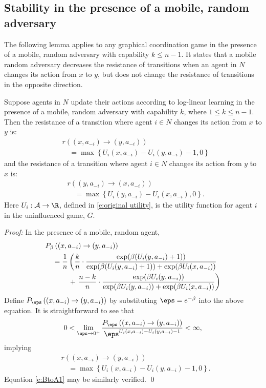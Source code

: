 \subsection{Stability in the presence of a mobile, random adversary}\label{a:mobile random}

The following lemma applies to any graphical coordination game in the presence of a mobile, random adversary with capability $k\leq n-1$. It states that a mobile random adversary decreases the resistance of transitions when an agent in $N$ changes its action from $x$ to $y$, but does not change the resistance of transitions in the opposite direction.

\begin{lemma}\label{t:mobile random}
Suppose agents in $N$ update their actions according to log-linear learning in the presence of a mobile, random adversary with capability $k$, where $1\leq k\leq n-1.$ Then the resistance of a transition where agent $i\in N$ changes its action from $x$ to $y$ is:
\begin{align}
&r((x,a_{-i})\to (y,a_{-i}) )\nonumber\\
&\quad=  \max\left\{U_i(x,a_{-i}) - U_i(y,a_{-i}) -1,0\right\}
\end{align}
and the resistance of a transition where agent $i\in N$ changes its action from $y$ to $x$ is:
\begin{align}
&r((y,a_{-i})\to (x,a_{-i}) )\nonumber\\
&\quad=  \max\left\{U_i(y,a_{-i}) - U_i(x,a_{-i}), 0\right\}.\label{e:BtoA1}
\end{align}
Here $U_i:\mathcal{A}\to\R$, defined in \eqref{e:original utility}, is the utility function for agent $i$ in the uninfluenced game, $G$.  
\end{lemma}

\noindent\emph{Proof:}
In the presence of a mobile, random agent, %
\begin{align*}
&P_\beta \left((x,a_{-i})\to (y,a_{-i})\right) \\
&\quad= {1\over n} \left({k\over n}\cdot{\exp( \beta(U_i(y,a_{-i})+1))\over \exp( \beta (U_i(y,a_{-i})+1)) + \exp( \beta U_i(x,a_{-i}))}\right.\\
&\hspace{0.45in} + \left.{n-k\over n}\cdot{\exp( \beta U_i(y,a_{-i}))\over \exp( \beta U_i(y,a_{-i})) + \exp( \beta U_i(x,a_{-i}))}\right)
\end{align*}
Define $P_\eps\left((x,a_{-i})\to (y,a_{-i})\right)$ by substituting $\eps = e^{-\beta}$ into the above equation. It is straightforward to see that
\begin{equation*}
0<\lim_{\eps\to 0^+}{P_{\eps} \left((x,a_{-i})\to (y,a_{-i})\right)\over \eps^{  U_i(x,a_{-i}) - U_i(y,a_{-i}) -1 }}<\infty,
\end{equation*}
implying 
\begin{align*}
&r((x,a_{-i})\to (y,a_{-i}) )\nonumber\\
&\quad=  \max\left\{U_i(x,a_{-i}) - U_i(y,a_{-i}) -1,0\right\}.
\end{align*}
Equation \eqref{e:BtoA1} may be similarly verified.
\hfill\qed

